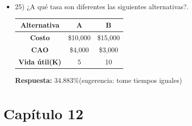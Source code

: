 \begin{itemize}
	\item 25) ¿A qué tasa son diferentes las siguientes alternativas?.\\
    \begin{center}
        \begin{tabular}{|c|c|c|}
            \hline
            \textbf{Alternativa} & \textbf{A} & \textbf{B} \\ \hline
            \textbf{Costo} & \$10,000 & \$15,000 \\ \hline
            \textbf{CAO} & \$4,000 & \$3,000 \\ \hline
            \textbf{Vida útil(K)} & 5 & 10 \\ \hline
		      \end{tabular}
	      \end{center}
	      \textbf{ Respuesta:} 34.883\%(sugerencia: tome tiempos iguales)
	      \medskip
	      

\end{itemize}


\chapter*{Capítulo 12}

